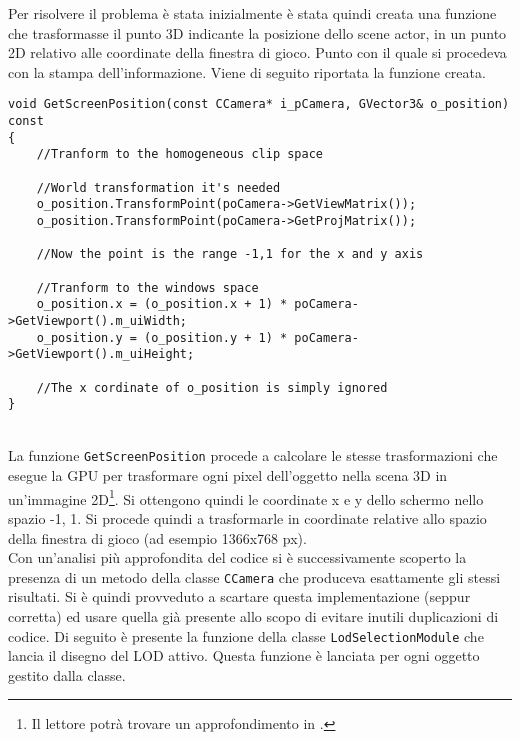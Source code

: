 Per risolvere il problema è stata inizialmente è stata quindi creata una funzione che trasformasse il punto 3D indicante la posizione dello scene actor, in un punto 2D relativo alle coordinate della finestra di gioco. Punto con il quale si procedeva con la stampa dell'informazione. Viene di seguito riportata la funzione creata.\\

\begin{lstlisting}[style=maurizio-code, caption=Metodo per la trasformazione di un punto 3D in un punto 2D della finestra di gioco rispetto la telecamera corrente, label={code:getScreenPosition}]
void GetScreenPosition(const CCamera* i_pCamera, GVector3& o_position) const
{	
	//Tranform to the homogeneous clip space
	
	//World transformation it's needed
	o_position.TransformPoint(poCamera->GetViewMatrix());
	o_position.TransformPoint(poCamera->GetProjMatrix());
	
	//Now the point is the range -1,1 for the x and y axis
	
	//Tranform to the windows space
	o_position.x = (o_position.x + 1) * poCamera->GetViewport().m_uiWidth;
	o_position.y = (o_position.y + 1) * poCamera->GetViewport().m_uiHeight;
	
	//The x cordinate of o_position is simply ignored 
}
\end{lstlisting}
~\\
La funzione \texttt{GetScreenPosition} procede a calcolare le stesse trasformazioni che esegue la GPU per trasformare ogni pixel dell'oggetto nella scena 3D in un'immagine 2D\footnote{Il lettore potrà trovare un approfondimento in \cite[chp.~5]{inbook:directx-book}.}. Si ottengono quindi le coordinate x e y dello schermo nello spazio -1, 1. Si procede quindi a trasformarle in coordinate relative allo spazio della finestra di gioco (ad esempio 1366x768 px).\\

Con un'analisi più approfondita del codice si è successivamente scoperto la presenza di un metodo della classe \texttt{CCamera} che produceva esattamente gli stessi risultati. Si è quindi provveduto a scartare questa implementazione (seppur corretta) ed usare quella già presente allo scopo di evitare inutili duplicazioni di codice. Di seguito è presente la funzione della classe \texttt{LodSelectionModule} che lancia il disegno del LOD attivo. Questa funzione è lanciata per ogni oggetto gestito dalla classe.\\\vspace*{-0.3cm}

